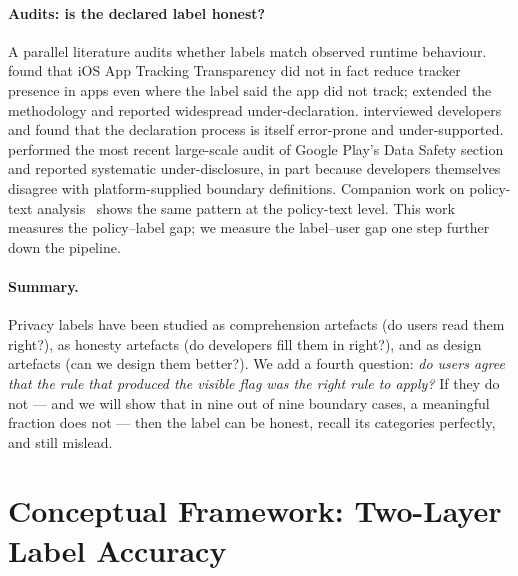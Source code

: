 \documentclass[11pt,a4paper]{article}
\makeatletter
\let\@oldsection\section
\renewcommand{\section}{\FloatBarrier\@oldsection}
\makeatother
\begin{document}
\paragraph{Audits: is the declared label honest?}
A parallel literature audits whether labels match observed runtime
behaviour. \citet{kollnig:etal:2022} found that iOS App Tracking
Transparency did not in fact reduce tracker presence in apps even
where the label said the app did not track; \citet{koch:etal:2022}
extended the methodology and reported widespread under-declaration.
\citet{bhagavatula:etal:2023} interviewed developers and found that
the declaration process is itself error-prone and under-supported.
\citet{khandelwal:etal:2023} performed the most recent large-scale
audit of Google Play's Data Safety section and reported systematic
under-disclosure, in part because developers themselves disagree with
platform-supplied boundary definitions. Companion work on policy-text
analysis~\citep{wilson:etal:2016,harkous:etal:2018,cui:etal:2023,
andow:etal:2020,reyes:etal:2018,razaghpanah:etal:2018,
englehardt:narayanan:2016,nguyen:etal:2022,ren:etal:2018,
shipp:blasco:2020} shows the same pattern at the policy-text level.
This work measures the policy--label gap; we measure the label--user
gap one step further down the pipeline.

\paragraph{Summary.}
Privacy labels have been studied as comprehension artefacts (do users
read them right?), as honesty artefacts (do developers fill them in
right?), and as design artefacts (can we design them better?). We add
a fourth question: \emph{do users agree that the rule that produced
the visible flag was the right rule to apply?} If they do not --- and
we will show that in nine out of nine boundary cases, a meaningful
fraction does not --- then the label can be honest, recall its
categories perfectly, and still mislead.

\section{Conceptual Framework: Two-Layer Label Accuracy}\label{sec:framework}
\end{document}
